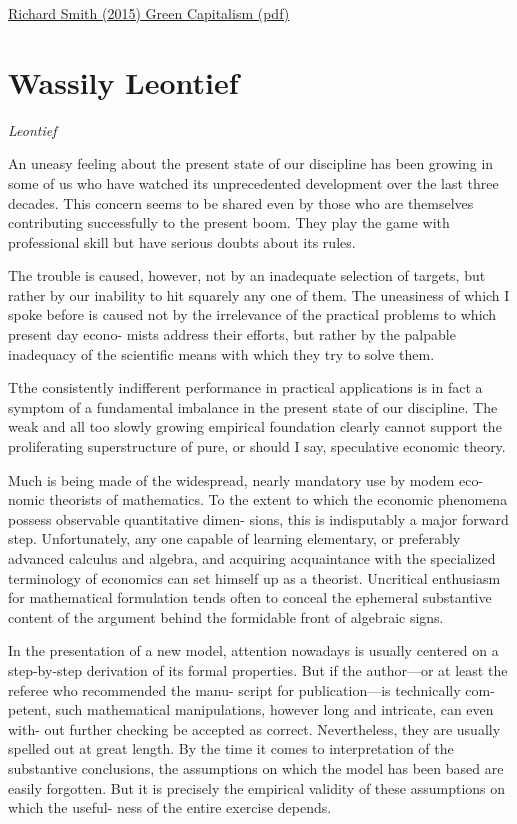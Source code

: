 \documentclass[
]{book}
\begin{document}
\href{pdf/Richard_Smith_Green_Capitalism_the_God_that_Failed.pdf}{Richard Smith (2015) Green Capitalism (pdf)}

\hypertarget{wassily-leontief}{%
\section{Wassily Leontief}\label{wassily-leontief}}

\emph{Leontief}

An uneasy feeling about the
present state of our discipline has been
growing in some of us who have watched
its unprecedented development over the
last three decades. This concern seems to
be shared even by those who are themselves
contributing successfully to the
present boom. They play the game with
professional skill but have serious doubts
about its rules.

The trouble
is caused, however, not by an inadequate
selection of targets, but rather by our
inability to hit squarely any one of them.
The uneasiness of which I spoke before is
caused not by the irrelevance of the practical
problems to which present day econo-
mists address their efforts, but rather by
the palpable inadequacy of the scientific
means with which they try to solve them.

Tthe consistently indifferent
performance in practical applications is in
fact a symptom of a fundamental imbalance
in the present state of our discipline.
The weak and all too slowly growing empirical
foundation clearly cannot support
the proliferating superstructure of pure, or
should I say, speculative economic theory.

Much is being made of the widespread,
nearly mandatory use by modem eco-
nomic theorists of mathematics. To the
extent to which the economic phenomena
possess observable quantitative dimen-
sions, this is indisputably a major forward
step. Unfortunately, any one capable of
learning elementary, or preferably advanced
calculus and algebra, and acquiring
acquaintance with the specialized terminology
of economics can set himself up as a
theorist.
Uncritical enthusiasm for mathematical
formulation tends often to conceal
the ephemeral substantive content of
the argument behind the formidable front
of algebraic signs.

In the presentation of a new model,
attention nowadays is usually centered on
a step-by-step derivation of its formal
properties. But if the author---or at least
the referee who recommended the manu-
script for publication---is technically com-
petent, such mathematical manipulations,
however long and intricate, can even with-
out further checking be accepted as
correct. Nevertheless, they are usually
spelled out at great length. By the time it
comes to interpretation of the substantive
conclusions, the assumptions on which the
model has been based are easily forgotten.
But it is precisely the empirical validity
of these assumptions on which the useful-
ness of the entire exercise depends.
\end{document}
